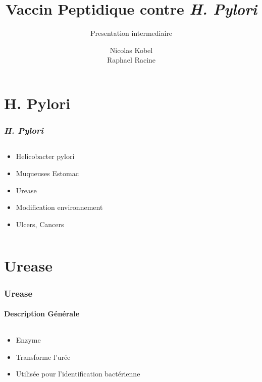 \documentclass[11pt, notes, handout]{beamer}
\author{Nicolas Kobel \\Raphael Racine}
\title{Vaccin Peptidique contre \textit{H. Pylori}}
\subtitle{Presentation intermediaire}
\newcommand{\hpyl}{\textit{H. Pylori}}
\begin{document}
\begin{frame}
\titlepage
\end{frame}

\begin{frame}
\tableofcontents
\end{frame}

\section{H. Pylori}
\begin{frame}
\frametitle{\hpyl}
\begin{columns}[c]
	\begin{column}[c]{5cm}
		\begin{itemize}[<+->]
			\item Helicobacter pylori
			\item Muqueuses Estomac
			\item Urease
			\item Modification environnement
			\item Ulcers, Cancers
		\end{itemize}
	\end{column}
	\begin{column}[c]{5cm}
	\end{column}
\end{columns}
\end{frame}

\section{Urease}
\begin{frame}
\frametitle{Urease}
\framesubtitle{Description Générale}
\begin{columns}[c]
	\begin{column}[c]{5cm}
		\begin{itemize}[<+->]
			\item Enzyme
			\item Transforme l'urée
			\item Utilisée pour l'identification bactérienne
		\end{itemize}
	\end{column}
	\begin{column}[c]{5cm}
	\end{column}
\end{columns}
\end{frame}
\end{document}
